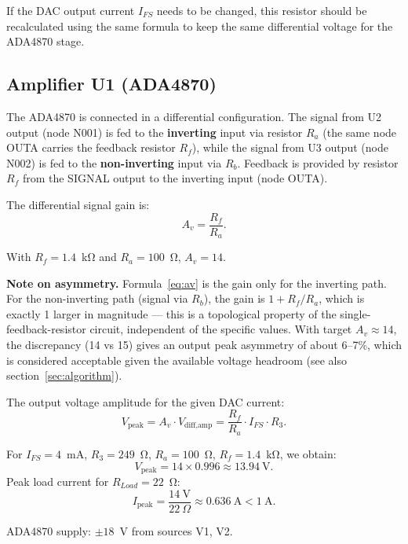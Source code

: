\documentclass[a4paper, 12pt]{article}
\begin{document}
\par If the DAC output current \(I_{FS}\) needs to be changed, this resistor should be recalculated using the same formula to keep the same differential voltage for the ADA4870 stage.

\subsection{Amplifier U1 (ADA4870)}

The ADA4870 is connected in a differential configuration.
The signal from U2 output (node N001) is fed to the \textbf{inverting}
input via resistor \(R_a\) (the same node OUTA carries the feedback
resistor \(R_f\)), while the signal from U3 output (node N002) is fed to
the \textbf{non-inverting} input via \(R_b\). Feedback is provided by
resistor \(R_f\) from the SIGNAL output to the inverting input (node OUTA).

The differential signal gain is:
\begin{equation}
    A_v = \frac{R_f}{R_a}.
    \label{eq:av}
\end{equation}

With \(R_f = 1.4\)~kΩ and \(R_a = 100\)~Ω, \(A_v = 14\).

\textbf{Note on asymmetry.} Formula~\eqref{eq:av} is the gain only for
the inverting path. For the non-inverting path (signal via \(R_b\)), the gain
is \(1+R_f/R_a\), which is exactly 1 larger in magnitude — this is a
topological property of the single-feedback-resistor circuit, independent
of the specific values. With target \(A_v\approx14\), the discrepancy
(14 vs 15) gives an output peak asymmetry of about 6--7\%, which is
considered acceptable given the available voltage headroom (see also
section~\ref{sec:algorithm}).

The output voltage amplitude for the given DAC current:
\begin{equation}
    V_{\text{peak}} = A_v \cdot V_{\text{diff,amp}}
    = \frac{R_f}{R_a} \cdot I_{FS} \cdot R_3.
    \label{eq:vpeak}
\end{equation}

For \(I_{FS}=4\)~mA, \(R_3=249\)~Ω, \(R_a=100\)~Ω, \(R_f=1.4\)~kΩ,
we obtain:
\[
    V_{\text{peak}} = 14 \times 0.996 \approx 13.94\ \text{V}.
\]
Peak load current for \(R_{Load}=22\)~Ω:
\[
    I_{\text{peak}} = \frac{14\ \text{V}}{22\ \Omega} \approx 0.636\ \text{A} < 1\ \text{A}.
\]

ADA4870 supply: $\pm 18$~V from sources V1, V2.
\end{document}
